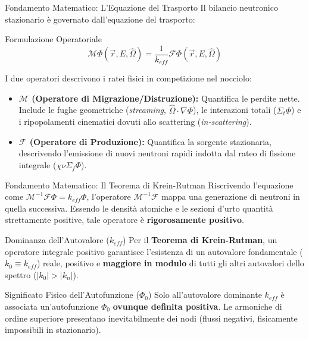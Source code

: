 \documentclass[aspectratio=169]{beamer} %
\begin{document}
\begin{frame}{Fondamento Matematico: L'Equazione del Trasporto}
Il bilancio neutronico stazionario è governato dall'equazione del trasporto:

\begin{alertblock}{Formulazione Operatoriale}
\begin{equation*}
\mathcal{M} \Phi(\vec{r}, E, \hat{\Omega}) = \frac{1}{k_{eff}} \mathcal{F} \Phi(\vec{r}, E, \hat{\Omega})
 \end{equation*}
\end{alertblock}

I due operatori descrivono i ratei fisici in competizione nel nocciolo:

\begin{itemize}
\item \textbf{$\mathcal{M}$ (Operatore di Migrazione/Distruzione):} Quantifica le perdite nette. Include le fughe geometriche (\textit{streaming}, $\hat{\Omega} \cdot \nabla \Phi$), le interazioni totali ($\Sigma_t \Phi$) e i ripopolamenti cinematici dovuti allo scattering (\textit{in-scattering}).
\item \textbf{$\mathcal{F}$ (Operatore di Produzione):} Quantifica la sorgente stazionaria, descrivendo l'emissione di nuovi neutroni rapidi indotta dal rateo di fissione integrale ($\chi \nu \Sigma_f \Phi$).
\end{itemize}
\end{frame}

\begin{frame}{Fondamento Matematico: Il Teorema di Krein-Rutman}
Riscrivendo l'equazione come $\mathcal{M}^{-1}\mathcal{F} \Phi = k_{eff} \Phi$, l'operatore $\mathcal{M}^{-1}\mathcal{F}$ mappa una generazione di neutroni in quella successiva. Essendo le densità atomiche e le sezioni d'urto quantità strettamente positive, tale operatore è \textbf{rigorosamente positivo}.

\begin{block}{Dominanza dell'Autovalore ($k_{eff}$)}
Per il \textbf{Teorema di Krein-Rutman}, un operatore integrale positivo garantisce l'esistenza di un autovalore fondamentale ($k_0 \equiv k_{eff}$) reale, positivo e \textbf{maggiore in modulo} di tutti gli altri autovalori dello spettro ($|k_0| > |k_n|$).
\end{block}

\begin{alertblock}{Significato Fisico dell'Autofunzione ($\Phi_0$)}
Solo all'autovalore dominante $k_{eff}$ è associata un'autofunzione $\Phi_0$ \textbf{ovunque definita positiva}. Le armoniche di ordine superiore presentano inevitabilmente dei nodi (flussi negativi, fisicamente impossibili in stazionario).
\end{alertblock}
\end{frame}
\end{document}
